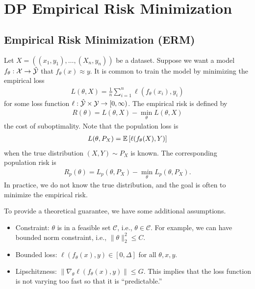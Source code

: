 \documentclass[11pt, a4paper]{article}
\newcommand{\E}[1]{\mathify{\mathbb{E}\left[#1\right]}}
\begin{document}
\section{DP Empirical Risk Minimization}
\subsection{Empirical Risk Minimization (ERM)}
Let $X = ((x_1, y_1), \dots, (X_n, y_n))$ be a dataset.
Suppose we want a model $f_\theta:{\cal X}\rightarrow \hat{{\cal Y}}$ that $f_{\theta}(x) \approx y$.
It is common to train the model by minimizing the empirical loss
\begin{align}
    L(\theta, X) = \frac{1}{n}\sum_{i=1}^n \ell(f_{\theta}(x_i), y_i)
\end{align}
for some loss function $\ell: \hat{{\cal Y}}\times {\cal Y}\rightarrow [0, \infty)$.
The empirical risk is defined by
\begin{align}
    R(\theta) = L(\theta, X) - \min_\theta L(\theta, X)
\end{align}
the cost of suboptimality.
Note that the population loss is
\begin{align}
    L(\theta, P_X) = \E{\ell(f_{\theta}(X), Y)}
\end{align}
when the true distribution $(X, Y)\sim P_X$ is known.
The corresponding population risk is
\begin{align}
    R_p(\theta) = L_p(\theta, P_X) - \min_\theta L_p(\theta, P_X).
\end{align}
In practice, we do not know the true distribution, and the goal is often to minimize the empirical risk.

To provide a theoretical guarantee, we have some additional assumptions.
\begin{itemize}
    \item Constraint: $\theta$ is in a feasible set $\mathcal{C}$, i.e., $\theta\in\mathcal{C}$.
        For example, we can have bounded norm constraint, i.e., $\|\theta\|_2^2\leq C$.
    \item Bounded loss: $\ell(f_{\theta}(x), y) \in [0, \Delta]$ for all $\theta, x, y$.
    \item Lipschitzness: $\|\nabla_\theta \ell(f_\theta(x), y)\|\leq G$.
        This implies that the loss function is not varying too fast so that it is ``predictable.''
\end{itemize}
\end{document}
